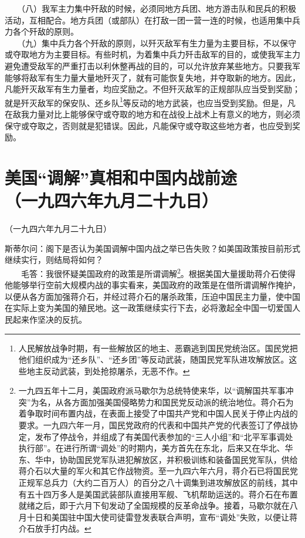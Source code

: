 \documentclass[cn,11pt,chinese]{elegantbook}
\def\myformat#1{\hfil\hfil #1}
\begin{document}
　　（八）我军主力集中歼敌的时候，必须同地方兵团、地方游击队和民兵的积极活动，互相配合。地方兵团（或部队）在打敌一团一营一连的时候，也适用集中兵力各个歼敌的原则。\\
　　（九）集中兵力各个歼敌的原则，以歼灭敌军有生力量为主要目标，不以保守或夺取地方为主要目标。有些时机，为着集中兵力歼击敌军的目的，或使我军主力避免遭受敌军的严重打击以利休整再战的目的，可以允许放弃某些地方。只要我军能够将敌军有生力量大量地歼灭了，就有可能恢复失地，并夺取新的地方。因此，凡能歼灭敌军有生力量者，均应奖励之。不但歼灭敌军的正规部队应当受到奖励；就是歼灭敌军的保安队、还乡队\footnote[8]{ 人民解放战争时期，有一些解放区的地主、恶霸逃到国民党统治区。国民党把他们组织成为“还乡队”、“还乡团”等反动武装，随国民党军队进攻解放区。这些地主反动武装，到处抢掠屠杀，无恶不作。}等反动的地方武装，也应当受到奖励。但是，凡在敌我力量对比上能够保守或夺取的地方和在战役上战术上有意义的地方，则必须保守或夺取之，否则就是犯错误。因此，凡能保守或夺取这些地方者，也应受到奖励。\\
\newpage\section*{\myformat{美国“调解”真相和中国内战前途}\\\myformat{（一九四六年九月二十九日）}}
\begin{introduction}\item （一九四六年九月二十九日）\end{introduction}
斯蒂尔问：阁下是否认为美国调解中国内战之举已告失败？如美国政策按目前形式继续实行，则结局将如何？\\
　　毛答：我很怀疑美国政府的政策是所谓调解\footnote[1]{ 一九四五年十二月，美国政府派马歇尔为总统特使来华，以“调解国共军事冲突”为名，从各方面加强美国侵略势力和国民党反动派的统治地位。蒋介石为着争取时间布置内战，在表面上接受了中国共产党和中国人民关于停止内战的要求。一九四六年一月，国民党政府的代表和中国共产党的代表签订了停战协定，发布了停战令，并组成了有美国代表参加的“三人小组”和“北平军事调处执行部”。在进行所谓“调处”的时期内，美方首先在东北，后来又在华北、华东、华中，协助国民党军队进犯解放区，并积极训练和装备国民党军队，供给蒋介石以大量的军火和其它作战物资。至一九四六年六月，蒋介石已将国民党正规军总兵力（大约二百万人）的百分之八十调集到进攻解放区的前线，其中有五十四万多人是美国武装部队直接用军舰、飞机帮助运送的。蒋介石在布置就绪之后，即于六月下旬发动了全国规模的反革命战争。接着，马歇尔就在八月十日和美国驻中国大使司徒雷登发表联合声明，宣布“调处”失败，以便让蒋介石放手打内战。}。根据美国大量援助蒋介石使得他能够举行空前大规模内战的事实看来，美国政府的政策是在借所谓调解作掩护，以便从各方面加强蒋介石，并经过蒋介石的屠杀政策，压迫中国民主力量，使中国在实际上变为美国的殖民地。这一政策继续实行下去，必将激起全中国一切爱国人民起来作坚决的反抗。\\
\end{document}

